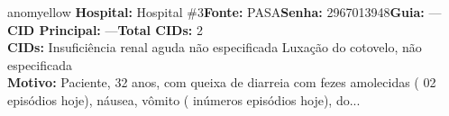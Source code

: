 \documentclass[a4paper,10pt]{article}
\begin{document}
\begin{anomalycard}[Interna\c{c}\~{a}o \#185487 | Pac. \#111180 | MODERADO (z=2.65) | LOS: 16d | 07/03/2026\,$\to$\,—]{anomyellow}
\textbf{Hospital:} Hospital \#3\quad \textbf{Fonte:} PASA\quad \textbf{Senha:} 2967013948\quad \textbf{Guia:} ---\\

\textbf{CID Principal:} {\small ---}\quad\textbf{Total CIDs:} 2\\

\textbf{CIDs:} {\scriptsize Insuficiência renal aguda não especificada \textbar{} Luxação do cotovelo, não especificada}\\

\textbf{Motivo:} {\scriptsize Paciente, 32 anos, com queixa de diarreia com fezes amolecidas ( 02 episódios hoje), náusea, vômito ( inúmeros episódios hoje), do...}\\



\end{anomalycard}
\end{document}
